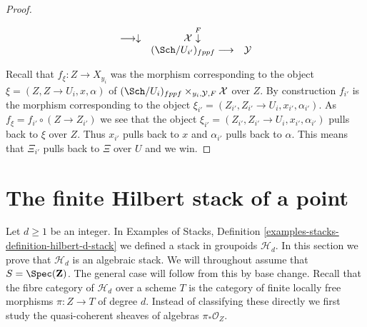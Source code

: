 \begin{proof}
\begin{enumerate}
$$\begin{array}{ccc}
\longrightarrow\downarrow & \mathcal{X} \overset{F}{\downarrow} \\  & (\Sch/U_{i'})_{fppf} \longrightarrow & \mathcal{Y}\end{array}
$$
\end{enumerate}
Recall that $f_\xi : Z \to X_{y_i}$ was the morphism corresponding to
the object $\xi = (Z, Z \to U_i, x, \alpha)$ of
$(\Sch/U_i)_{fppf} \times_{y_i, \mathcal{Y}, F} \mathcal{X}$
over $Z$. By construction $f_{i'}$ is the morphism corresponding to
the object $\xi_{i'} = (Z_{i'}, Z_{i'} \to U_i, x_{i'}, \alpha_{i'})$.
As $f_\xi = f_{i'} \circ (Z \to Z_{i'})$ we see that
the object $\xi_{i'} = (Z_{i'}, Z_{i'} \to U_i, x_{i'}, \alpha_{i'})$ pulls
back to $\xi$ over $Z$. Thus $x_{i'}$ pulls back to $x$ and $\alpha_{i'}$
pulls back to $\alpha$. This means that $\Xi_{i'}$ pulls back
to $\Xi$ over $U$ and we win.
\end{proof}

\section{The finite Hilbert stack of a point}
\label{criteria-section-hilbert-point}
Let $d \geq 1$ be an integer. In
Examples of Stacks, Definition \ref{examples-stacks-definition-hilbert-d-stack}
we defined a stack in groupoids $\mathcal{H}_d$.
In this section we prove that $\mathcal{H}_d$ is an
algebraic stack. We will throughout assume that
$S = \Spec(\mathbf{Z})$.
The general case will follow from this by base change.
Recall that the fibre category of $\mathcal{H}_d$ over a scheme $T$
is the category of finite locally free morphisms $\pi : Z \to T$ of
degree $d$. Instead of classifying these directly we first
study the quasi-coherent sheaves of algebras $\pi_*\mathcal{O}_Z$.

